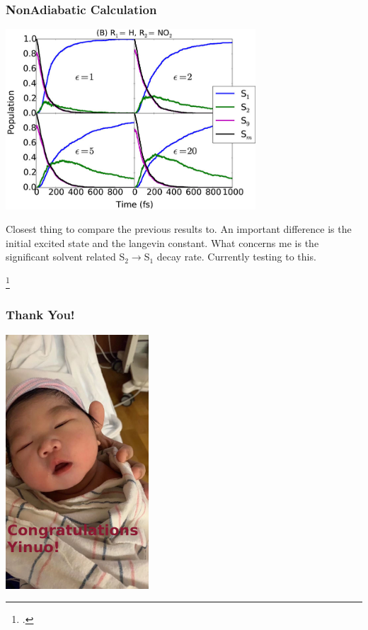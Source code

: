 \documentclass{beamer}
\begin{document}
\begin{frame}
  \frametitle{NonAdiabatic Calculation}
  \includegraphics[width=0.7\textwidth]{Images/nasifain.jpeg} \footnotemark

  Closest thing to compare the previous results to. An important difference is
  the initial excited state and the langevin constant. What concerns me is the
  significant solvent related S$_2$$\rightarrow$S$_1$ decay rate. Currently testing to this.

  \footcitetext{sifain2018photoexcited}
\end{frame}


\begin{frame}
  \frametitle{Thank You!}
  \centering
  \includegraphics[width=0.4\textwidth]{Images/baby.jpg}
\end{frame}



 \begin{frame}
     \printbibliography
 \end{frame} 
\end{document}

